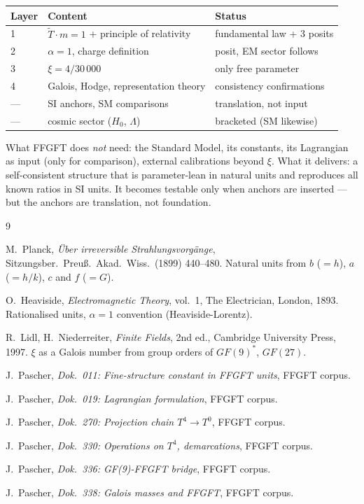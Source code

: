 \begin{center}
\begin{tabular}{@{}lll@{}}
\toprule
Layer & Content & Status \\
\midrule
1 & $\tilde{T}\cdot m=1$ + principle of relativity & fundamental law + 3 posits \\
2 & $\alpha=1$, charge definition & posit, EM sector follows \\
3 & $\xi=4/30\,000$ & only free parameter \\
4 & Galois, Hodge, representation theory & consistency confirmations \\
\midrule
--- & SI anchors, SM comparisons & translation, not input \\
--- & cosmic sector ($H_0$, $\Lambda$) & bracketed (SM likewise) \\
\bottomrule
\end{tabular}
\end{center}

What FFGFT does \emph{not} need: the Standard Model, its constants, its
Lagrangian as input (only for comparison), external calibrations beyond $\xi$.
What it delivers: a self-consistent structure that is parameter-lean in natural
units and reproduces all known ratios in SI units. It becomes testable only when
anchors are inserted --- but the anchors are translation, not foundation.

\begin{thebibliography}{9}

M.~Planck,
\textit{\"Uber irreversible Strahlungsvorg\"ange},
Sitzungsber.\ Preu\ss.\ Akad.\ Wiss.\ (1899) 440--480.
Natural units from $b$ ($=h$), $a$ ($=h/k$), $c$ and $f$ ($=G$).

O.~Heaviside,
\textit{Electromagnetic Theory}, vol.~1,
The Electrician, London, 1893.
Rationalised units, $\alpha=1$ convention (Heaviside-Lorentz).

R.~Lidl, H.~Niederreiter,
\textit{Finite Fields},
2nd ed., Cambridge University Press, 1997.
$\xi$ as a Galois number from group orders of $GF(9)^*$, $GF(27)$.

J.~Pascher,
\textit{Dok.~011: Fine-structure constant in FFGFT units},
FFGFT corpus.

J.~Pascher,
\textit{Dok.~019: Lagrangian formulation},
FFGFT corpus.

J.~Pascher,
\textit{Dok.~270: Projection chain $T^4\to T^0$},
FFGFT corpus.

J.~Pascher,
\textit{Dok.~330: Operations on $T^4$, demarcations},
FFGFT corpus.

J.~Pascher,
\textit{Dok.~336: GF(9)-FFGFT bridge},
FFGFT corpus.

J.~Pascher,
\textit{Dok.~338: Galois masses and FFGFT},
FFGFT corpus.

\end{thebibliography}
